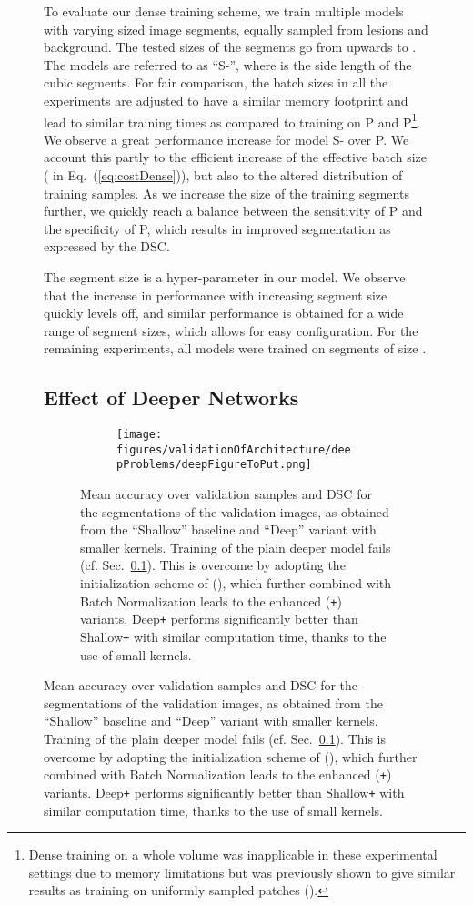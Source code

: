 \documentclass[preprint,authoryear,12pt]{elsarticle}
\newcommand{\quot}[1]{``#1''}
\begin{document}
\begin{figure}[h]
To evaluate our dense training scheme, we train multiple models with varying sized image segments, equally sampled from lesions and background. The tested sizes of the segments go from  upwards to . The models are referred to as \quot{S-}, where  is the side length of the cubic segments. For fair comparison, the batch sizes in all the experiments are adjusted to have a similar memory footprint and lead to similar training times as compared to training on P and P\footnote{Dense training on a whole volume was inapplicable in these experimental settings due to memory limitations but was previously shown to give similar results as training on uniformly sampled patches (\cite{Long2014}).}. We observe a great performance increase for model S- over P. We account this partly to the efficient increase of the effective batch size ( in Eq.~(\ref{eq:costDense})), but also to the altered distribution of training samples. As we increase the size of the training segments further, we quickly reach a balance between the sensitivity of P and the specificity of P, which results in improved segmentation as expressed by the DSC.

The segment size is a hyper-parameter in our model. We observe that the increase in performance with increasing segment size quickly levels off, and similar performance is obtained for a wide range of segment sizes, which allows for easy configuration. For the remaining experiments, all models were trained on segments of size .


\subsection{Effect of Deeper Networks}
\label{subsec:valDeeper}

\begin{figure}[!h]
\centering
\begin{subfigure}[b]{0.5\textwidth}
\centering
\texttt{[image: figures/validationOfArchitecture/deepProblems/deepFigureToPut.png]}
\end{subfigure}
\caption{Mean accuracy over validation samples and DSC for the segmentations of the validation images, as obtained from the \quot{Shallow} baseline and \quot{Deep} variant with smaller kernels. Training of the plain deeper model fails (cf. Sec.~\ref{subsec:valDeeper}). This is overcome by adopting the initialization scheme of (\cite{he2015delving}), which further combined with Batch Normalization leads to the enhanced (\texttt{+}) variants. Deep\texttt{+} performs significantly better than Shallow\texttt{+} with similar computation time, thanks to the use of small kernels.
}
\label{fig:deepProblems}
\end{figure}
%
 

\end{figure}
\end{document}
